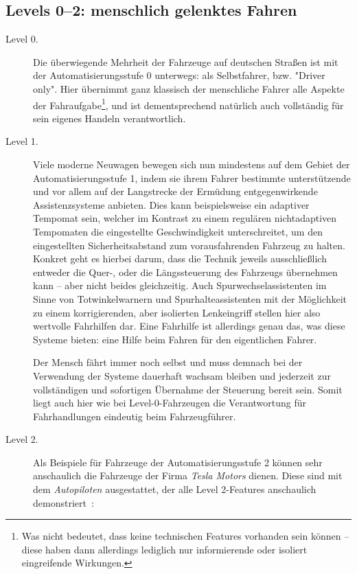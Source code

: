 \documentclass[twocolumn, german]{tum-article}
\begin{document}
\subsection{Levels 0--2: menschlich gelenktes Fahren}
\begin{description}
	\item[Level 0.] Die überwiegende Mehrheit der Fahrzeuge auf deutschen Straßen ist mit der Automatisierungsstufe 0 unterwegs: als Selbstfahrer, bzw. "Driver only".
	Hier übernimmt ganz klassisch der menschliche Fahrer alle Aspekte der Fahraufgabe\footnote{Was nicht bedeutet, dass keine technischen Features vorhanden sein können -- diese haben dann allerdings lediglich nur informierende oder isoliert eingreifende Wirkungen.}, und ist dementsprechend natürlich auch vollständig für sein eigenes Handeln verantwortlich.
	
	
	\item[Level 1.] Viele moderne Neuwagen bewegen sich nun mindestens auf dem Gebiet der Automatisierungsstufe 1, indem sie ihrem Fahrer bestimmte unterstützende und vor allem auf der Langstrecke der Ermüdung entgegenwirkende Assistenzsysteme anbieten.
	Dies kann beispielsweise ein adaptiver Tempomat sein, welcher im Kontrast zu einem regulären nichtadaptiven Tempomaten die eingestellte Geschwindigkeit unterschreitet, um den eingestellten Sicherheitsabstand zum vorausfahrenden Fahrzeug zu halten.
	Konkret geht es hierbei darum, dass die Technik jeweils ausschließlich entweder die Quer-, oder die Längssteuerung des Fahrzeugs übernehmen kann -- aber nicht beides gleichzeitig.
	Auch Spurwechselassistenten im Sinne von Totwinkelwarnern und Spurhalteassistenten mit der Möglichkeit zu einem korrigierenden, aber isolierten Lenkeingriff stellen hier also wertvolle Fahrhilfen dar.
	Eine Fahrhilfe ist allerdings genau das, was diese Systeme bieten: eine Hilfe beim Fahren für den eigentlichen Fahrer.
	
	Der Mensch fährt immer noch selbst und muss demnach bei der Verwendung der Systeme dauerhaft wachsam bleiben und jederzeit zur vollständigen und sofortigen Übernahme der Steuerung bereit sein.
	Somit liegt auch hier wie bei Level-0-Fahrzeugen die Verantwortung für Fahrhandlungen eindeutig beim Fahrzeugführer.
	
	
	\item[Level 2.] Als Beispiele für Fahrzeuge der Automatisierungsstufe 2 können sehr anschaulich die Fahrzeuge der Firma \emph{Tesla Motors} dienen.
	Diese sind mit dem \emph{Autopiloten} ausgestattet, der alle Level 2-Features anschaulich demonstriert~\cite{tesla-ap}:
	

\end{description}
\end{document}
